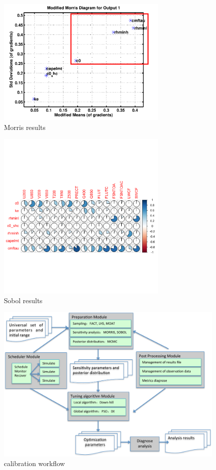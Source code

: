 \documentclass[gmd, manuscript]{copernicus}
\begin{document}

\begin{figure}[t]
\includegraphics[width=8.3cm]{Morris}
\caption{Morris results}
\end{figure}

\begin{figure}[t]
\includegraphics[width=8.3cm]{Sobol}
\caption{Sobol results}
\end{figure}

\begin{figure}[t]
\includegraphics[width=15.3cm]{workflow}
\caption{calibration workflow}
\end{figure}
\end{document}
